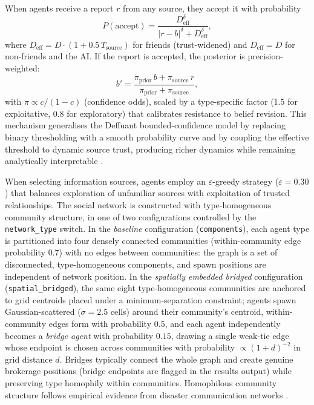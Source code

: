When agents receive a report $r$ from any source, they accept it with probability
%
\begin{equation}
  P(\text{accept}) = \frac{D_{\mathrm{eff}}^{\delta}}
                          {|r-b|^{\delta}+D_{\mathrm{eff}}^{\delta}},
  \label{eq:acceptance}
\end{equation}
%
where $D_{\mathrm{eff}} = D\cdot(1+0.5\,T_{\mathrm{source}})$ for friends
(trust-widened) and $D_{\mathrm{eff}}=D$ for non-friends and the AI.
If the report is accepted, the posterior is precision-weighted:
%
\begin{equation}
  b' = \frac{\pi_{\mathrm{prior}}\,b + \pi_{\mathrm{source}}\,r}
            {\pi_{\mathrm{prior}} + \pi_{\mathrm{source}}},
  \label{eq:bayesian}
\end{equation}
%
with $\pi\propto c/(1-c)$ (confidence odds), scaled by a type-specific factor
(1.5 for exploitative, 0.8 for exploratory) that calibrates resistance to belief
revision.
This mechanism generalises the Deffuant bounded-confidence model
\citep{deffuant2000mixing} by replacing binary thresholding with a smooth
probability curve and by coupling the effective threshold to dynamic source trust,
producing richer dynamics while remaining analytically interpretable
\citep{lorenz2017continuous}.

When selecting information sources, agents employ an $\varepsilon$-greedy strategy
($\varepsilon=0.30$) that balances exploration of unfamiliar sources with
exploitation of trusted relationships.
The social network is constructed with type-homogeneous community structure, in
one of two configurations controlled by the \texttt{network\_type} switch.
In the \emph{baseline} configuration (\texttt{components}), each agent type is
partitioned into four densely connected communities (within-community edge
probability $0.7$) with no edges between communities: the graph is a set of
disconnected, type-homogeneous components, and spawn positions are independent of
network position.
In the \emph{spatially embedded bridged} configuration
(\texttt{spatial\_bridged}), the same eight type-homogeneous communities are
anchored to grid centroids placed under a minimum-separation constraint; agents
spawn Gaussian-scattered ($\sigma=2.5$ cells) around their community's centroid,
within-community edges form with probability $0.5$, and each agent independently
becomes a \emph{bridge agent} with probability $0.15$, drawing a single weak-tie
edge whose endpoint is chosen across communities with probability
$\propto (1+d)^{-2}$ in grid distance $d$.
Bridges typically connect the whole graph and create genuine brokerage positions
(bridge endpoints are flagged in the results output) while preserving type
homophily within communities.
Homophilous community structure follows empirical evidence from disaster
communication networks \citep{Bruns2012,Sutton2008}.

